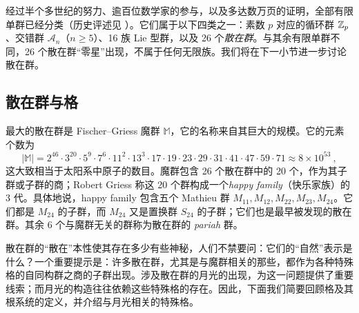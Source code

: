 经过半个多世纪的努力、逾百位数学家的参与，以及多达数万页的证明，全部有限单群已经分类（历史评述见 \cite{GorensteinDaniel1982Fsg:, RonaldSolomon2001Abho}）。它们属于以下四类之一：素数 $p$ 对应的循环群 $\mathbb{Z}_p$、交错群 $\mathcal{A}_n$（$n\geq5$）、16 族 Lie 型群，以及 26 个\emph{散在群}。与其余有限单群不同，26 个散在群“零星”出现，不属于任何无限族。我们将在下一小节进一步讨论散在群。


\subsection{散在群与格}
\label{sec:sporadic_lattices}

最大的散在群是 Fischer–Griess 魔群 $\mathbb M$，它的名称来自其巨大的规模。它的元素个数为
\[
|\mathbb M| =  2^{46} \cdot 3^{20} \cdot 5^9 \cdot 7^6 \cdot 11^2 \cdot 13^3 \cdot 17 \cdot 19 \cdot 23 \cdot 29 \cdot 31 \cdot 41 \cdot 47 \cdot 59 \cdot 71 \approx 8 \times 10^{53}~, 
\]
这大致相当于太阳系中原子的数目。魔群包含 26 个散在群中的 20 个，作为其子群或子群的商；Robert Griess 称这 20 个群构成一个\emph{happy family}（快乐家族）的 3 代。具体地说，happy family 包含五个 Mathieu 群 $M_{11}, M_{12}, M_{22}, M_{23}, M_{24}$。它们都是 $M_{24}$ 的子群，而 $M_{24}$ 又是置换群 $S_{24}$ 的子群；它们也是最早被发现的散在群。其余 6 个与魔群无关的群称为散在群的 \emph{pariah} 群。

散在群的“散在”本性使其存在多少有些神秘，人们不禁要问：它们的“自然”表示是什么？一个重要提示是：许多散在群，尤其是与魔群相关的那些，都作为各种特殊格的自同构群之商的子群出现。涉及散在群的月光的出现，为这一问题提供了重要线索；而月光的构造往往依赖这些特殊格的存在。因此，下面我们简要回顾格及其根系统的定义，并介绍与月光相关的特殊格。

